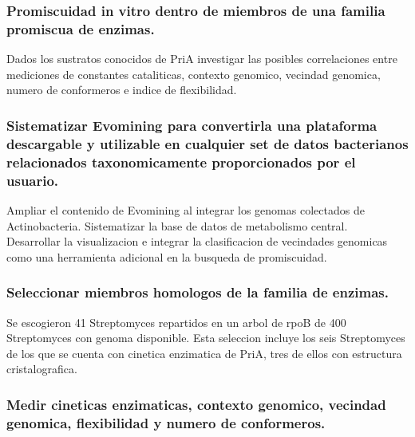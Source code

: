 \documentclass[12pt,twoside]{reedthesis}
\begin{document}
  \subsubsection{Promiscuidad in vitro dentro de miembros de una familia
  promiscua de
  enzimas.}\label{promiscuidad-in-vitro-dentro-de-miembros-de-una-familia-promiscua-de-enzimas.}
  
  Dados los sustratos conocidos de PriA investigar las posibles
  correlaciones entre mediciones de constantes cataliticas, contexto
  genomico, vecindad genomica, numero de conformeros e indice de
  flexibilidad.
  
  \subsubsection{Sistematizar Evomining para convertirla una plataforma
  descargable y utilizable en cualquier set de datos bacterianos
  relacionados taxonomicamente proporcionados por el
  usuario.}\label{sistematizar-evomining-para-convertirla-una-plataforma-descargable-y-utilizable-en-cualquier-set-de-datos-bacterianos-relacionados-taxonomicamente-proporcionados-por-el-usuario.}
  
  Ampliar el contenido de Evomining al integrar los genomas colectados de
  Actinobacteria. Sistematizar la base de datos de metabolismo central.\\
  Desarrollar la visualizacion e integrar la clasificacion de vecindades
  genomicas como una herramienta adicional en la busqueda de promiscuidad.
  
  \subsubsection{Seleccionar miembros homologos de la familia de
  enzimas.}\label{seleccionar-miembros-homologos-de-la-familia-de-enzimas.}
  
  Se escogieron 41 Streptomyces repartidos en un arbol de rpoB de 400
  Streptomyces con genoma disponible. Esta seleccion incluye los seis
  Streptomyces de los que se cuenta con cinetica enzimatica de PriA, tres
  de ellos con estructura cristalografica.
  
  \subsubsection{Medir cineticas enzimaticas, contexto genomico, vecindad
  genomica, flexibilidad y numero de
  conformeros.}\label{medir-cineticas-enzimaticas-contexto-genomico-vecindad-genomica-flexibilidad-y-numero-de-conformeros.}
  
\end{document}
